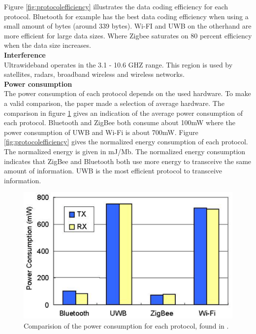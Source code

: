 \documentclass[10pt,a4paper]{article}
\begin{document}
Figure \ref{fig:protocolefficiency} illustrates the data coding efficiency for each protocol. Bluetooth for example has the best data coding efficiency when using a small amount of bytes (around 339 bytes). Wi-FI and UWB on the otherhand are more efficient for large data sizes. Where Zigbee saturates on 80 percent efficiency when the data size increases.\\


\textbf{Interference}\\
Ultrawideband operates in the 3.1 - 10.6 GHZ range. This region is used by satellites, radars, broadband wireless and wireless networks.\\



\textbf{Power consumption}\\
The power consumption of each protocol depends on the used hardware. To make a valid comparison, the paper \cite{comparitivestudywirelessprotocols} made a selection of average hardware. The comparison in figure \ref{fig:protocolenergy} gives an indication of the average power consumption of each protocol. Bluetooth and ZigBee both consume about 100mW where the power consumption of UWB and Wi-Fi is about 700mW. Figure \ref{fig:protocolefficiency} gives the normalized energy consumption of each protocol. The normalized energy is given in mJ/Mb. The normalized energy consumption indicates that ZigBee and Bluetooth both use more energy to transceive the same amount of information. UWB is the most efficient protocol to transceive information.



\begin{figure}[H]
   \centering
   \includegraphics[width=1\textwidth]{images/protocolenergy.png}
   \caption{Comparision of the power consumption for each protocol, found in \cite{comparitivestudywirelessprotocols}.}
   \label{fig:protocolenergy}
\end{figure}
\end{document}

